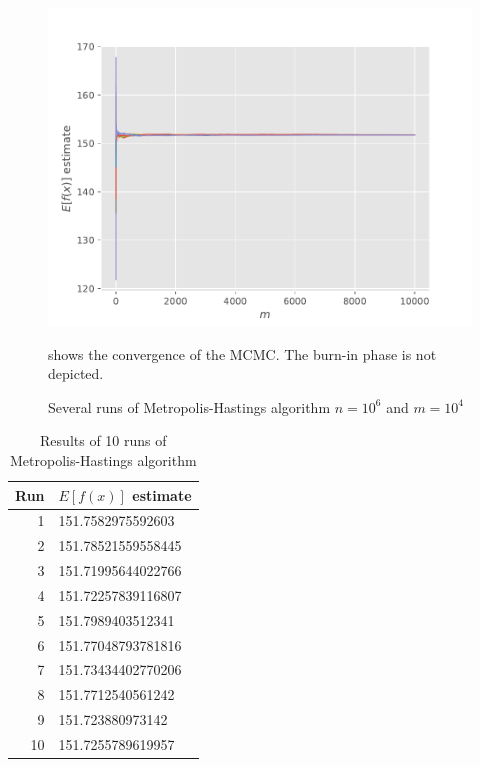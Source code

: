 \documentclass[6pt,oneside]{article}
\begin{document}
\begin{figure}[h]
    \center
    \caption{Several runs of Metropolis-Hastings algorithm $n=10^{6}$ and $m=10^{4}$}
    \includegraphics[scale=0.8]{../src/fig2.pdf}
    \footnotesize
    \vspace{10pt}

     shows the convergence of the MCMC. The burn-in phase is not depicted.
\end{figure}

\begin{table}[h]
    \center
    \caption{Results of 10 runs of Metropolis-Hastings algorithm}
    \label{fig:12}
    \begin{tabular}{rl}
        Run & $E\left[ f(x) \right]$ estimate \\
        \hline
        1 & 151.7582975592603 \\
        2 & 151.78521559558445 \\
        3 & 151.71995644022766 \\
        4 & 151.72257839116807 \\
        5 & 151.7989403512341 \\
        6 & 151.77048793781816 \\
        7 & 151.73434402770206 \\
        8 & 151.7712540561242 \\
        9 & 151.723880973142 \\
        10 & 151.7255789619957 \\
    \end{tabular}
\end{table}
\end{document}
